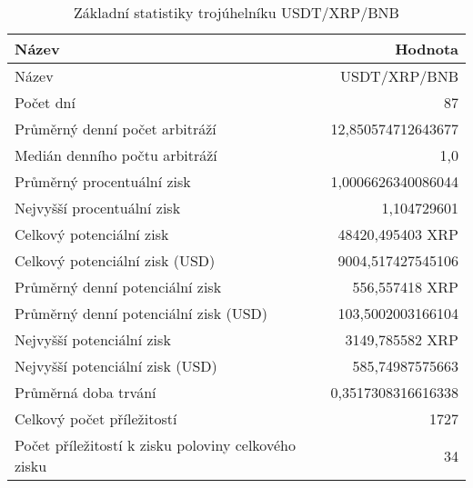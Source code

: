 \begin{table}\centering
\caption{Základní statistiky trojúhelníku USDT/XRP/BNB}
\label{USDTXRPBNB_stats}
\begin{tabular}{|| l | r ||}
\hline Název & Hodnota \\ 
\hline\hline Název & USDT/XRP/BNB \\ 
\hline Počet dní & 87 \\ 
\hline Průměrný denní počet arbitráží & 12,850574712643677 \\ 
\hline Medián denního počtu arbitráží & 1,0 \\ 
\hline Průměrný procentuální zisk & 1,0006626340086044 \\ 
\hline Nejvyšší procentuální zisk & 1,104729601 \\ 
\hline Celkový potenciální zisk & 48420,495403 XRP \\ 
\hline Celkový potenciální zisk (USD) & 9004,517427545106 \\ 
\hline Průměrný denní potenciální zisk & 556,557418 XRP \\ 
\hline Průměrný denní potenciální zisk (USD) & 103,5002003166104 \\ 
\hline Nejvyšší potenciální zisk & 3149,785582 XRP \\ 
\hline Nejvyšší potenciální zisk (USD) & 585,74987575663 \\ 
\hline Průměrná doba trvání & 0,3517308316616338 \\ 
\hline Celkový počet příležitostí & 1727 \\ 
\hline Počet příležitostí k zisku poloviny celkového zisku & 34 \\ 
\hline
\end{tabular}
\end{table}